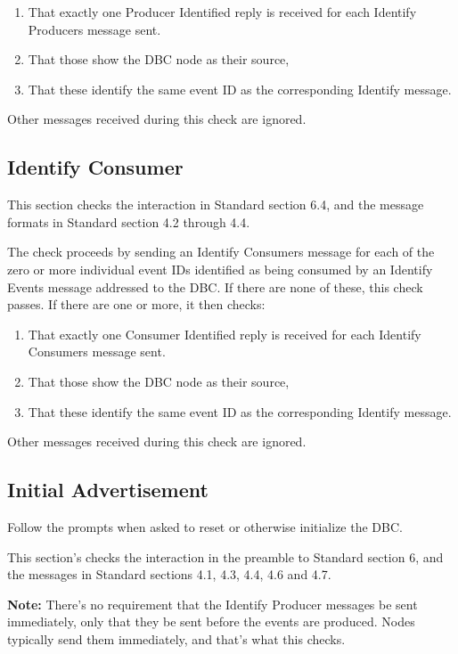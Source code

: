 \begin{enumerate}
\item That exactly one Producer Identified reply is received
    for each Identify Producers message sent.
\item That those show the DBC node as their source,
\item That these identify the same event ID as the corresponding Identify message.
\end{enumerate}

Other messages received during this check are ignored.

\subsection{Identify Consumer}

This section checks the interaction in Standard section 6.4, and
the message formats in Standard section 4.2 through 4.4.

The check proceeds by sending an Identify Consumers message for each of
the zero or more individual event IDs identified as being consumed by an Identify Events message 
addressed to the DBC. If there are none of these, this check passes. If there
are one or more, it then checks:

\begin{enumerate}
\item That exactly one Consumer Identified reply is received 
    for each Identify Consumers message sent.
\item That those show the DBC node as their source,
\item That these identify the same event ID as the corresponding Identify message.
\end{enumerate}

Other messages received during this 
check are ignored.

\subsection{Initial Advertisement}

Follow the prompts when asked to reset or otherwise initialize the DBC.

This section's checks the interaction in the preamble to Standard section 6, and
the messages in Standard sections 4.1, 4.3, 4.4, 4.6 and 4.7.

\textbf{Note:}  There's no requirement that the Identify Producer messages
be sent immediately, only that they be sent before the events are produced.
Nodes typically send them immediately, and that's what this checks.

